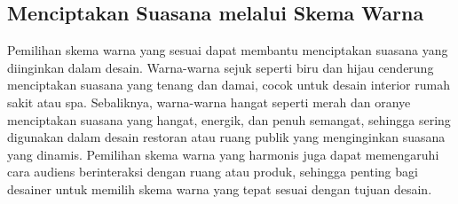 \documentclass[a4paper]{article}
\begin{document}
\subsection{Menciptakan Suasana melalui Skema Warna}
Pemilihan skema warna yang sesuai dapat membantu menciptakan suasana yang diinginkan dalam desain. Warna-warna sejuk seperti biru dan hijau cenderung menciptakan suasana yang tenang dan damai, cocok untuk desain interior rumah sakit atau spa. Sebaliknya, warna-warna hangat seperti merah dan oranye menciptakan suasana yang hangat, energik, dan penuh semangat, sehingga sering digunakan dalam desain restoran atau ruang publik yang menginginkan suasana yang dinamis. Pemilihan skema warna yang harmonis juga dapat memengaruhi cara audiens berinteraksi dengan ruang atau produk, sehingga penting bagi desainer untuk memilih skema warna yang tepat sesuai dengan tujuan desain.
\end{document}
